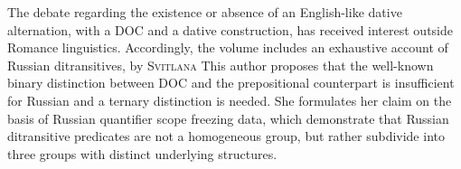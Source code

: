 \begin{styleListNumberi}
The debate regarding the existence or absence of an English-like dative alternation, with a DOC and a dative construction, has received interest outside Romance linguistics. Accordingly, the volume includes an exhaustive account of Russian ditransitives, by \textsc{Svitlana} This author proposes that the well-known binary distinction between DOC and the prepositional counterpart is insufficient for Russian and a ternary distinction is needed. She formulates her claim on the basis of Russian quantifier scope freezing data, which demonstrate that Russian ditransitive predicates are not a homogeneous group, but rather subdivide into three groups with distinct underlying structures. 
\end{styleListNumberi}

